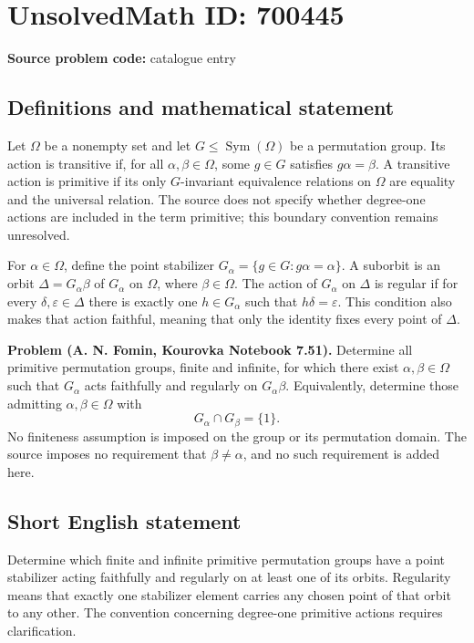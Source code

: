 \documentclass[11pt]{article}
\begin{document}
\section*{UnsolvedMath ID: 700445}
\textbf{Source problem code:} catalogue entry
\subsection{Definitions and mathematical statement}
Let \(\Omega\) be a nonempty set and let \(G\leq\operatorname{Sym}(\Omega)\) be a permutation group. Its action is transitive if, for all \(\alpha,\beta\in\Omega\), some \(g\in G\) satisfies \(g\alpha=\beta\). A transitive action is primitive if its only \(G\)-invariant equivalence relations on \(\Omega\) are equality and the universal relation. The source does not specify whether degree-one actions are included in the term primitive; this boundary convention remains unresolved.

For \(\alpha\in\Omega\), define the point stabilizer \(G_\alpha=\{g\in G:g\alpha=\alpha\}\). A suborbit is an orbit \(\Delta=G_\alpha\beta\) of \(G_\alpha\) on \(\Omega\), where \(\beta\in\Omega\). The action of \(G_\alpha\) on \(\Delta\) is regular if for every \(\delta,\varepsilon\in\Delta\) there is exactly one \(h\in G_\alpha\) such that \(h\delta=\varepsilon\). This condition also makes that action faithful, meaning that only the identity fixes every point of \(\Delta\).

\textbf{Problem (A. N. Fomin, Kourovka Notebook 7.51).} Determine all primitive permutation groups, finite and infinite, for which there exist \(\alpha,\beta\in\Omega\) such that \(G_\alpha\) acts faithfully and regularly on \(G_\alpha\beta\). Equivalently, determine those admitting \(\alpha,\beta\in\Omega\) with
\[
G_\alpha\cap G_\beta=\{1\}.
\]
No finiteness assumption is imposed on the group or its permutation domain. The source imposes no requirement that \(\beta\neq\alpha\), and no such requirement is added here.
\subsection{Short English statement}
Determine which finite and infinite primitive permutation groups have a point stabilizer acting faithfully and regularly on at least one of its orbits. Regularity means that exactly one stabilizer element carries any chosen point of that orbit to any other. The convention concerning degree-one primitive actions requires clarification.
\end{document}
